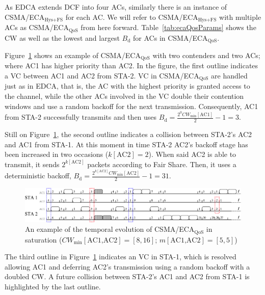 As EDCA extends DCF into four ACs, similarly there is an instance of CSMA/ECA$_{\text{Hys+FS}}$ for each AC. We will refer to CSMA/ECA$_{\text{Hys+FS}}$ with multiple ACs as CSMA/ECA$_{\text{QoS}}$ from here forward. Table~\ref{tab:ecaQosParams} shows the CW as well as the lowest and largest $B_{\text{d}}$ for ACs in CSMA/ECA$_{\text{QoS}}$.

Figure~\ref{fig:ecaQoS} shows an example of CSMA/ECA$_{\text{QoS}}$ with two contenders and two ACs; where AC1 has higher priority than AC2. In the figure, the first outline indicates a VC between AC1 and AC2 from STA-2. VC in CSMA/ECA$_{\text{QoS}}$ are handled just as in EDCA, that is, the AC with the highest priority is granted access to the channel, while the other ACs involved in the VC double their contention windows and use a random backoff for the next transmission. Consequently, AC1 from STA-2 successfully transmits and then uses $B_{\text{d}}=\frac{2^{0}CW_{\min}[\text{AC1}]}{2}-1= 3$.

Still on Figure~\ref{fig:ecaQoS}, the second outline indicates a collision between STA-2's AC2 and AC1 from STA-1. At this moment in time STA-2 AC2's backoff stage has been increased in two occasions ($k[\text{AC2}]=2$). When said AC2 is able to transmit, it sends $2^{k[\text{AC2}]}$ packets according to Fair Share. Then, it uses a deterministic backoff, $B_{\text{d}}=\frac{2^{k[\text{AC2}]}CW_{\min}[\text{AC2}]}{2}-1=31$.

	\begin{figure}[tb]
	\centering
		\includegraphics[width=0.9\linewidth]{figures/csma-eca-hew-oldScheme-fixed.eps}
		\caption{An example of the temporal evolution of CSMA/ECA$_{\text{QoS}}$ in saturation ($CW_{\min}[\text{AC1,AC2}]=[8,16]$; $m[\text{AC1,AC2}]=[5,5]$)}
		\label{fig:ecaQoS}
	\end{figure}

The third outline in Figure~\ref{fig:ecaQoS} indicates an VC in STA-1, which is resolved allowing AC1 and deferring AC2's transmission using a random backoff with a doubled CW. A future collision between STA-2's AC1 and AC2 from STA-1 is highlighted by the last outline.

